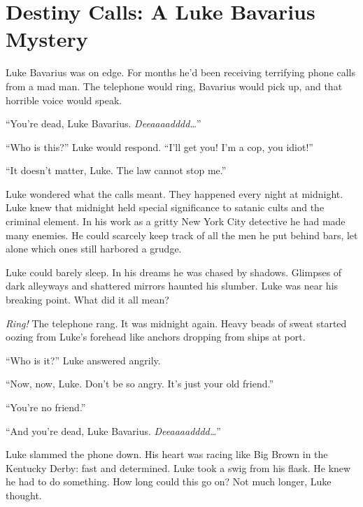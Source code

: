 \chapter[Destiny Calls]{Destiny Calls: A Luke Bavarius Mystery}


Luke Bavarius was on edge. For months he'd been receiving
terrifying phone calls from a mad man. The telephone would ring,
Bavarius would pick up, and that horrible voice would speak.



``You're dead, Luke Bavarius. {\em Deeaaaadddd{\ldots}}''



``Who is this?'' Luke would respond. ``I'll get you! I'm a cop, you
idiot!''



``It doesn't matter, Luke. The law cannot stop me.''



Luke wondered what the calls meant. They happened every night at
midnight. Luke knew that midnight held special significance to
satanic cults and the criminal element. In his work as a gritty New
York City detective he had made many enemies. He could scarcely
keep track of all the men he put behind bars, let alone which ones
still harbored a grudge.



Luke could barely sleep. In his dreams he was chased by shadows.
Glimpses of dark alleyways and shattered mirrors haunted his
slumber. Luke was near his breaking point. What did it all
mean?



{\em Ring!} The telephone rang. It was midnight again. Heavy beads
of sweat started oozing from Luke's forehead like anchors dropping
from ships at port.



``Who is it?'' Luke answered angrily.



``Now, now, Luke. Don't be so angry. It's just your old
friend.''



``You're no friend.''



``And you're dead, Luke Bavarius. {\em Deeaaaadddd{\ldots}}''



Luke slammed the phone down. His heart was racing like Big Brown in
the Kentucky Derby: fast and determined. Luke took a swig from his
flask. He knew he had to do something. How long could this go on?
Not much longer, Luke thought.



